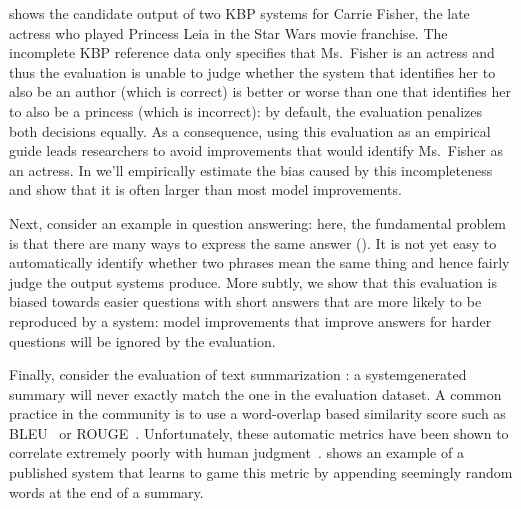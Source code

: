  shows the candidate output of two KBP systems for Carrie Fisher, the late actress who played Princess Leia in the Star Wars movie franchise.
The incomplete KBP reference data only specifies that Ms.\ Fisher is an actress and thus the evaluation is unable to judge whether the system that identifies her to also be an author (which is correct) is better or worse than one that identifies her to also be a princess (which is incorrect): by default, the evaluation penalizes both decisions equally.
As a consequence, using this evaluation as an empirical guide leads researchers to avoid improvements that would identify Ms.\ Fisher as an actress.
In  we'll empirically estimate the bias caused by this incompleteness and show that it is often larger than most model improvements.

Next, consider an example in question answering:
  here, the fundamental problem is that there are many ways to express the same answer ().
It is not yet easy to automatically identify whether two phrases mean the same thing and hence fairly judge the output systems produce.
More subtly, we show that this evaluation is biased towards easier questions with short answers that are more likely to be reproduced by a system:
  model improvements that improve answers for harder questions will be ignored by the evaluation.

Finally, consider the evaluation of text summarization : a system\pl{-}generated summary will never exactly match the one in the evaluation dataset.
A common practice in the community is to use a word-overlap based similarity score such as BLEU~\citep{papineni02bleu} or ROUGE~\citep{lin2004rouge}\@.
Unfortunately, these automatic metrics have been shown to correlate extremely poorly with human judgment~\citep{novikova2017why}.
 shows an example of a published system that learns to game this metric by appending seemingly random words at the end of a summary.

